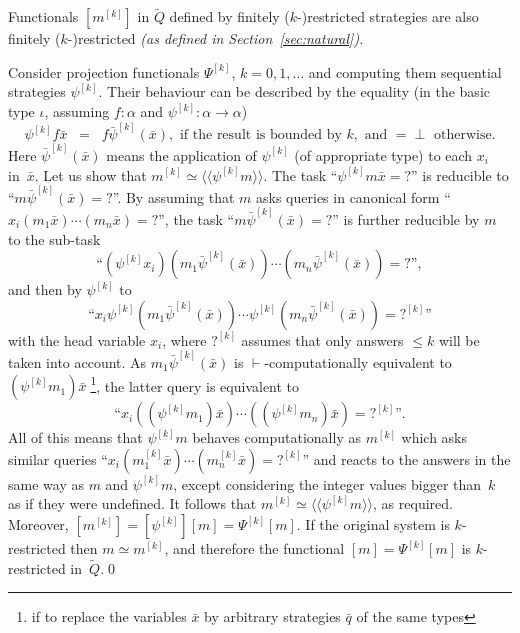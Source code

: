 \documentclass[fleqn]{LMCS}
\theoremstyle{plain}\newtheorem{satz}[thm]{Satz}
\theoremstyle{plain}\newtheorem{hyp}[thm]{Hypothesis}
\theoremstyle{plain}\newtheorem{hyps}[thm]{Hypotheses}
\theoremstyle{definition}\newtheorem{note}[thm]{Note}
\newcommand{\arr}{\rightarrow}
\newcommand{\lla}{\langle\!\langle}
\newcommand{\rra}{\rangle\!\rangle}
\newcommand{\Osem}[1]{\lla #1 \rra}
\newcommand{\Undef}{{\perp}}
\newcommand{\bx}{\bar{x}}
\newcommand{\bq}{\bar{q}}
\newcommand{\bpsi}{\bar{\psi}}
\newcommand{\tQ}{\tilde{Q}}
\newcommand{\?}{\mbox{?}}
\begin{document}
\begin{lem}\label{lemma:finitely-restricted}
Functionals $[m^{[k]}]$ in $\tQ$ defined by finitely ($k$-)restricted
strategies are also finitely ($k$-)restricted 
\em (as defined in Section~\ref{sec:natural}). 
\end{lem}
\proof 
Consider projection functionals $\Psi^{[k]}$, $k=0,1,\ldots$  
and computing them sequential strategies 
$\psi^{[k]}$. 
Their behaviour can be described by the equality (in the basic type $\iota$, 
assuming $f:\alpha$ and $\psi^{[k]}:\alpha\arr\alpha$) 
\begin{equation*}\label{eq:proj-strategy}
\psi^{[k]} f\bx \;\; = \;\; f\bpsi^{[k]} (\bx),\textrm{ if the result is bounded by }k, 
\textrm{ and }=\Undef\textrm{ otherwise}.
\nonumber
\end{equation*}
Here $\bpsi^{[k]} (\bx)$ means the application of $\psi^{[k]}$ (of appropriate type) 
to each $x_i$ in~$\bx$. 
Let us show that $m^{[k]}\simeq\Osem{\psi^{[k]} m}$. 
The task ``$\psi^{[k]} m\bx=\?$''
is reducible to ``$m\bpsi^{[k]}( \bx)=\?$''.
By assuming that $m$ asks queries in canonical form 
``$x_i(m_1\bx)\cdots(m_n\bx)=\?$'', 
the task ``$m\bpsi^{[k]}( \bx)=\?$'' is further reducible 
by $m$ to the sub-task  
\begin{equation*}
\textrm{``}(\psi^{[k]} x_i)(m_1\bpsi^{[k]}( \bx))\cdots(m_n\bpsi^{[k]}( \bx))=\?\textrm{''}, 
\end{equation*}
and then by $\psi^{[k]}$ to 
\begin{equation*}
\textrm{``}
x_i\psi^{[k]}(m_1\bpsi^{[k]}( \bx))\cdots\psi^{[k]}(m_n\bpsi^{[k]}( \bx))=\?^{[k]}
\textrm{''} 
\end{equation*}
with the head variable $x_i$, 
where $\?^{[k]}$ assumes that only answers ${}\le k$ will be taken into account. 
As $m_1\bpsi^{[k]}( \bx)$ is $\vdash$-computationally equivalent 
to $(\psi^{[k]} m_1)\bx\;$\footnote{if to replace the variables $\bx$ by arbitrary strategies $\bq$ 
of the same types
},
the latter query is equivalent to 
\begin{equation*}
\textrm{``}x_i((\psi^{[k]} m_1)\bx)\cdots((\psi^{[k]} m_n)\bx)=\?^{[k]}\textrm{''}.
\end{equation*}
All of this means that $\psi^{[k]} m$ behaves computationally as $m^{[k]}$ 
which asks similar queries 
``$x_i(m^{[k]}_1\bx)\cdots(m^{[k]}_n\bx)=\?^{[k]}$'' and reacts to the answers 
in the same way as $m$ and $\psi^{[k]} m$, 
except considering the integer values bigger than~$k$ as if they were undefined. 
It follows that $m^{[k]}\simeq\Osem{\psi^{[k]} m}$, as required. 
Moreover, $[m^{[k]}]=[\psi^{[k]}] [m]=\Psi^{[k]} [m]$. 
If the original system is $k$-restricted then $m\simeq m^{[k]}$, 
and therefore the functional $[m]=\Psi^{[k]} [m]$ is $k$-restricted in~$\tQ$.\qed
\end{document}
